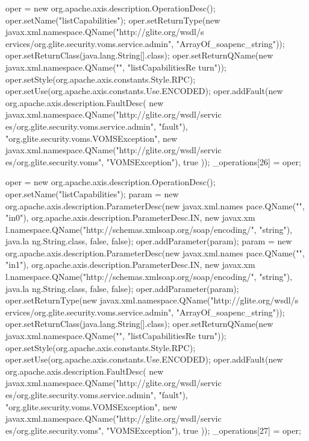 \begin{DoxyCode}
{        oper = new org.apache.axis.description.OperationDesc();
        oper.setName("listCapabilities");
        oper.setReturnType(new javax.xml.namespace.QName("http://glite.org/wsdl/s
      ervices/org.glite.security.voms.service.admin", "ArrayOf_soapenc_string"));
        oper.setReturnClass(java.lang.String[].class);
        oper.setReturnQName(new javax.xml.namespace.QName("", "listCapabilitiesRe
      turn"));
        oper.setStyle(org.apache.axis.constants.Style.RPC);
        oper.setUse(org.apache.axis.constants.Use.ENCODED);
        oper.addFault(new org.apache.axis.description.FaultDesc(
                      new javax.xml.namespace.QName("http://glite.org/wsdl/servic
      es/org.glite.security.voms.service.admin", "fault"),
                      "org.glite.security.voms.VOMSException",
                      new javax.xml.namespace.QName("http://glite.org/wsdl/servic
      es/org.glite.security.voms", "VOMSException"), 
                      true
                     ));
        _operations[26] = oper;

        oper = new org.apache.axis.description.OperationDesc();
        oper.setName("listCapabilities");
        param = new org.apache.axis.description.ParameterDesc(new javax.xml.names
      pace.QName("", "in0"), org.apache.axis.description.ParameterDesc.IN, new javax.xm
      l.namespace.QName("http://schemas.xmlsoap.org/soap/encoding/", "string"), java.la
      ng.String.class, false, false);
        oper.addParameter(param);
        param = new org.apache.axis.description.ParameterDesc(new javax.xml.names
      pace.QName("", "in1"), org.apache.axis.description.ParameterDesc.IN, new javax.xm
      l.namespace.QName("http://schemas.xmlsoap.org/soap/encoding/", "string"), java.la
      ng.String.class, false, false);
        oper.addParameter(param);
        oper.setReturnType(new javax.xml.namespace.QName("http://glite.org/wsdl/s
      ervices/org.glite.security.voms.service.admin", "ArrayOf_soapenc_string"));
        oper.setReturnClass(java.lang.String[].class);
        oper.setReturnQName(new javax.xml.namespace.QName("", "listCapabilitiesRe
      turn"));
        oper.setStyle(org.apache.axis.constants.Style.RPC);
        oper.setUse(org.apache.axis.constants.Use.ENCODED);
        oper.addFault(new org.apache.axis.description.FaultDesc(
                      new javax.xml.namespace.QName("http://glite.org/wsdl/servic
      es/org.glite.security.voms.service.admin", "fault"),
                      "org.glite.security.voms.VOMSException",
                      new javax.xml.namespace.QName("http://glite.org/wsdl/servic
      es/org.glite.security.voms", "VOMSException"), 
                      true
                     ));
        _operations[27] = oper;

}
\end{DoxyCode}
